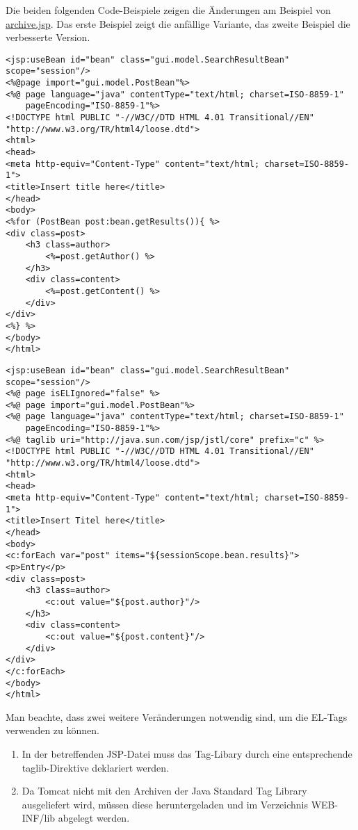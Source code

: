 Die beiden folgenden Code-Beispiele zeigen die Änderungen am Beispiel von \url{archive.jsp}. Das erste Beispiel zeigt die anfällige Variante, das zweite Beispiel die verbesserte Version.

\begin{lstlisting}
<jsp:useBean id="bean" class="gui.model.SearchResultBean" scope="session"/>
<%@page import="gui.model.PostBean"%>
<%@ page language="java" contentType="text/html; charset=ISO-8859-1"
    pageEncoding="ISO-8859-1"%>
<!DOCTYPE html PUBLIC "-//W3C//DTD HTML 4.01 Transitional//EN" "http://www.w3.org/TR/html4/loose.dtd">
<html>
<head>
<meta http-equiv="Content-Type" content="text/html; charset=ISO-8859-1">
<title>Insert title here</title>
</head>
<body>
<%for (PostBean post:bean.getResults()){ %>
<div class=post>
	<h3 class=author>
		<%=post.getAuthor() %>
	</h3>
	<div class=content>
		<%=post.getContent() %>
	</div>
</div>
<%} %>
</body>
</html>
\end{lstlisting}

\begin{lstlisting}
<jsp:useBean id="bean" class="gui.model.SearchResultBean" scope="session"/>
<%@ page isELIgnored="false" %>
<%@ page import="gui.model.PostBean"%>
<%@ page language="java" contentType="text/html; charset=ISO-8859-1"
    pageEncoding="ISO-8859-1"%>
<%@ taglib uri="http://java.sun.com/jsp/jstl/core" prefix="c" %>    
<!DOCTYPE html PUBLIC "-//W3C//DTD HTML 4.01 Transitional//EN" "http://www.w3.org/TR/html4/loose.dtd">
<html>
<head>
<meta http-equiv="Content-Type" content="text/html; charset=ISO-8859-1">
<title>Insert Titel here</title>
</head>
<body>
<c:forEach var="post" items="${sessionScope.bean.results}">
<p>Entry</p>
<div class=post>
	<h3 class=author>
		<c:out value="${post.author}"/>
	</h3>
	<div class=content>
		<c:out value="${post.content}"/>
	</div>
</div>
</c:forEach>
</body>
</html>
\end{lstlisting}

Man beachte, dass zwei weitere Veränderungen notwendig sind, um die EL-Tags verwenden zu können.
\begin{enumerate}
\item In der betreffenden JSP-Datei muss das Tag-Libary durch eine entsprechende taglib-Direktive deklariert werden. 
\item Da Tomcat nicht mit den Archiven der Java Standard Tag Library ausgeliefert wird, müssen diese heruntergeladen und im Verzeichnis WEB-INF/lib abgelegt werden.
\end{enumerate}

